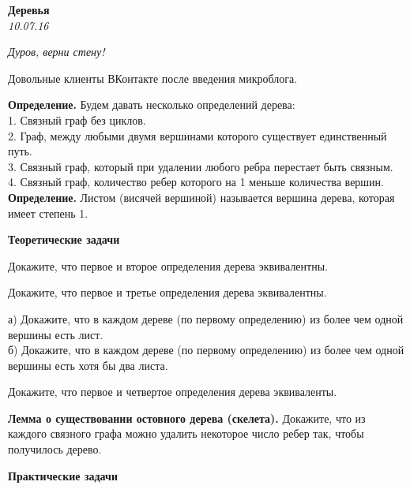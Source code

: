 \begin{center}
\textbf{\Large Деревья}\\
\textit{10.07.16}
\end{center}

\renewcommand{\epigraphwidth}{.35\textheight}
\epigraph{\it Дуров, верни стену!}{Довольные клиенты ВКонтакте после введения микроблога.}

\textbf{Определение.} Будем давать несколько определений дерева:\\
1. Связный граф без циклов.\\
2. Граф, между любыми двумя вершинами которого существует единственный путь.\\
3. Связный граф, который при удалении любого ребра перестает быть связным.\\
4. Связный граф, количество ребер которого на 1 меньше количества вершин.\\
\textbf{Определение.} Листом (висячей вершиной) называется вершина дерева, которая имеет степень 1.\\
\begin{center}
\textbf{Теоретические задачи}\\
\end{center}
\begin{problems}
\item Докажите, что первое и второе определения дерева эквивалентны.
\item Докажите, что первое и третье определения дерева эквивалентны. 
\item а) Докажите, что в каждом дереве (по первому определению) из более чем одной вершины есть лист.\\
б) Докажите, что в каждом дереве (по первому определению) из более чем одной вершины есть хотя бы два листа.
\item Докажите, что первое и четвертое определения дерева эквиваленты.
\item \textbf{Лемма о существовании остовного дерева (скелета).} Докажите, что из каждого связного графа можно удалить некоторое число ребер так, чтобы получилось дерево. 

\end{problems}
\begin{center}
\textbf{Практические задачи}\\
\end{center}
\resetproblem

